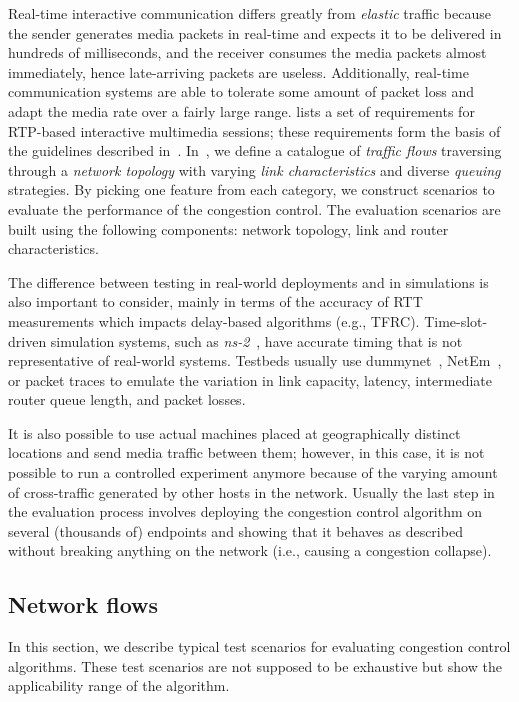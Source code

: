 Real-time interactive communication differs greatly from \emph{elastic}
traffic because the sender generates media packets in real-time and expects it
to be delivered in hundreds of milliseconds, and the receiver consumes the media
packets almost immediately, hence late-arriving packets are useless.
Additionally, real-time communication systems are able to tolerate some amount
of packet loss and adapt the media rate over a fairly large range.
\cite{draft.rmcat.req} lists a set of requirements for RTP-based interactive
multimedia sessions; these requirements form the basis of the guidelines
described in~\cite{draft.rmcat.evaluate}. In~\cite{draft.rmcat.eval.test}, we
define a catalogue of \emph{traffic flows} traversing through a \emph{network
topology} with varying \emph{link characteristics} and diverse \emph{queuing}
strategies. By picking one feature from each category, we
construct scenarios to evaluate the performance of the congestion control. The
evaluation scenarios are built using the following components: network
topology, link and router characteristics.

The difference between testing in real-world deployments and in simulations is
also important to consider, mainly in terms of the accuracy of RTT
measurements which impacts delay-based algorithms (e.g., TFRC). Time-slot-driven
simulation systems, such as \emph{ns-2}~\cite{ns2}, have accurate timing that
is not representative of real-world systems. Testbeds usually use
dummynet~\cite{Carbone:2010p3502}, NetEm~\cite{netem}, or packet traces to
emulate the variation in link capacity, latency, intermediate router queue
length, and packet losses.

It is also possible to use actual machines placed at geographically distinct
locations and send media traffic between them; however, in this case, it is
not possible to run a controlled experiment anymore because of the varying
amount of cross-traffic generated by other hosts in the network. Usually the
last step in the evaluation process involves deploying the congestion control
algorithm on several (thousands of) endpoints and showing that it behaves as
described without breaking anything on the network (i.e., causing a congestion
collapse).

\subsection{Network flows}

In this section, we describe typical test scenarios for evaluating congestion
control algorithms. These test scenarios are not supposed to be exhaustive
but show the applicability range of the algorithm.

